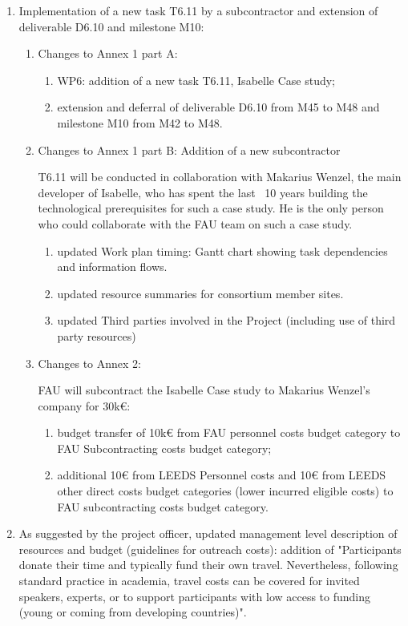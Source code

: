 \begin{enumerate}
\item Implementation of a new task T6.11 by a subcontractor and extension of deliverable D6.10 and milestone M10:
\begin{enumerate}
\item Changes to Annex 1 part A:
\begin{enumerate}
\item WP6: addition of a new task T6.11, Isabelle Case study;
\item extension and deferral of deliverable D6.10 from M45 to M48 and
  milestone M10 from M42 to M48.
\end{enumerate}

\item Changes to Annex 1 part B: Addition of a new subcontractor

T6.11 will be conducted in collaboration with Makarius Wenzel, the main developer of Isabelle, who has spent the last ~10 years building the technological prerequisites for such a case study. He is the only person who could collaborate with the FAU team on such a case study.
\begin{enumerate}
\item updated Work plan timing: Gantt chart showing task dependencies and information flows.
\item updated resource summaries for consortium member sites.
\item updated Third parties involved in the Project (including use of third party resources)
\end{enumerate}

\item Changes to Annex 2:

FAU will subcontract the Isabelle Case study to Makarius Wenzel's company for 30k€:
\begin{enumerate}
\item budget transfer of 10k€ from FAU personnel costs budget category to FAU Subcontracting costs budget category;
\item additional 10€ from LEEDS Personnel costs and 10€ from LEEDS other direct costs budget categories (lower incurred eligible costs) to FAU subcontracting costs budget category.
\end{enumerate}
\end{enumerate}

\item As suggested by the project officer, updated management level description of resources and budget (guidelines for outreach costs): addition of "Participants donate their time and typically fund their own travel. Nevertheless, following standard practice in academia, travel costs can be covered for invited speakers, experts, or to support participants with low access to funding (young or coming from developing countries)".


\end{enumerate}
